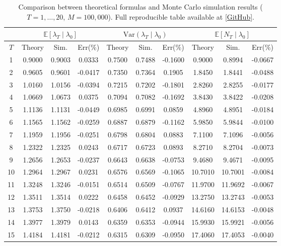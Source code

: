 \documentclass[12pt,a4paper]{report}
\newcommand{\githubrepo}{https://github.com/ldhuyjoseph/MasterThesis_paper-code}
\newcommand{\tablelink}[1]{\href{\githubrepo/numerical_experiments/outputs/tables/#1}{[GitHub]}}
\theoremstyle{plain}
\theoremstyle{definition}
\theoremstyle{remark}
\newcommand{\1}{\mathbf{1}}
\begin{document}
\begin{table}[H]
\centering
\caption{
Comparison between theoretical formulas and Monte Carlo simulation results
($T=1,\dots,20$, $M=100{,}000$).
Full reproducible table available at 
\tablelink{Table7_1_dz13_monte_carlo.csv}.
}
\label{tab:moment}
\begin{tabular}{c|ccc|ccc|ccc}
\hline
 & \multicolumn{3}{c|}{$\mathbb{E}[\lambda_T \mid \lambda_0]$}
 & \multicolumn{3}{c|}{$\mathrm{Var}(\lambda_T \mid \lambda_0)$}
 & \multicolumn{3}{c}{$\mathbb{E}[N_T \mid \lambda_0]$} \\
\hline
$T$
& Theory & Sim. & Err(\%)
& Theory & Sim. & Err(\%)
& Theory & Sim. & Err(\%) \\
\hline
1  & 0.9000 & 0.9003 & 0.0333 & 0.7500 & 0.7488 & -0.1600 & 0.9000 & 0.8994 & -0.0667 \\
2  & 0.9605 & 0.9601 & -0.0417 & 0.7350 & 0.7364 & 0.1905  & 1.8450 & 1.8441 & -0.0488 \\
3  & 1.0160 & 1.0156 & -0.0394 & 0.7215 & 0.7202 & -0.1801 & 2.8260 & 2.8255 & -0.0177 \\
4  & 1.0669 & 1.0673 & 0.0375  & 0.7094 & 0.7082 & -0.1692 & 3.8430 & 3.8422 & -0.0208 \\
5  & 1.1136 & 1.1131 & -0.0449 & 0.6985 & 0.6991 & 0.0859  & 4.8960 & 4.8951 & -0.0184 \\
6  & 1.1565 & 1.1562 & -0.0259 & 0.6887 & 0.6879 & -0.1162 & 5.9850 & 5.9844 & -0.0100 \\
7  & 1.1959 & 1.1956 & -0.0251 & 0.6798 & 0.6804 & 0.0883  & 7.1100 & 7.1096 & -0.0056 \\
8  & 1.2322 & 1.2325 & 0.0243  & 0.6717 & 0.6723 & 0.0893  & 8.2710 & 8.2704 & -0.0073 \\
9  & 1.2656 & 1.2653 & -0.0237 & 0.6643 & 0.6638 & -0.0753 & 9.4680 & 9.4671 & -0.0095 \\
10 & 1.2964 & 1.2967 & 0.0231  & 0.6576 & 0.6569 & -0.1065 & 10.7010& 10.7001& -0.0084 \\
11 & 1.3248 & 1.3246 & -0.0151 & 0.6514 & 0.6509 & -0.0767 & 11.9700& 11.9692& -0.0067 \\
12 & 1.3511 & 1.3514 & 0.0222  & 0.6458 & 0.6452 & -0.0929 & 13.2750& 13.2743& -0.0053 \\
13 & 1.3753 & 1.3750 & -0.0218 & 0.6406 & 0.6412 & 0.0937  & 14.6160& 14.6153& -0.0048 \\
14 & 1.3977 & 1.3979 & 0.0143  & 0.6359 & 0.6353 & -0.0944 & 15.9930& 15.9921& -0.0056 \\
15 & 1.4184 & 1.4181 & -0.0212 & 0.6315 & 0.6309 & -0.0950 & 17.4060& 17.4053& -0.0040 \\

\end{tabular}
\end{table}
\end{document}
